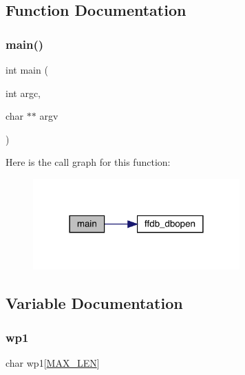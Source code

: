 \subsection{Function Documentation}
\mbox{\label{adat-devel_2other__libs_2filedb_2filehash_2tcreate_8c_a3c04138a5bfe5d72780bb7e82a18e627}} 
\subsubsection{\texorpdfstring{main()}{main()}}
{\footnotesize\ttfamily int main (\begin{DoxyParamCaption}\item[{int}]{argc,  }\item[{char $\ast$$\ast$}]{argv }\end{DoxyParamCaption})}

Here is the call graph for this function\+:
\nopagebreak
\begin{figure}[H]
\begin{center}
\leavevmode
\includegraphics[width=225pt]{d9/d64/adat-devel_2other__libs_2filedb_2filehash_2tcreate_8c_a3c04138a5bfe5d72780bb7e82a18e627_cgraph}
\end{center}
\end{figure}


\subsection{Variable Documentation}
\mbox{\label{adat-devel_2other__libs_2filedb_2filehash_2tcreate_8c_ae2b9e201e27e242b57e2ff99dff6d28a}} 
\subsubsection{\texorpdfstring{wp1}{wp1}}
{\footnotesize\ttfamily char wp1\mbox{[}\mbox{\hyperlink{adat__devel_2other__libs_2filedb_2filehash_2twrite_8c_aabf4f709c8199e41cf279c77112345fe}{M\+A\+X\+\_\+\+L\+EN}}\mbox{]}}

